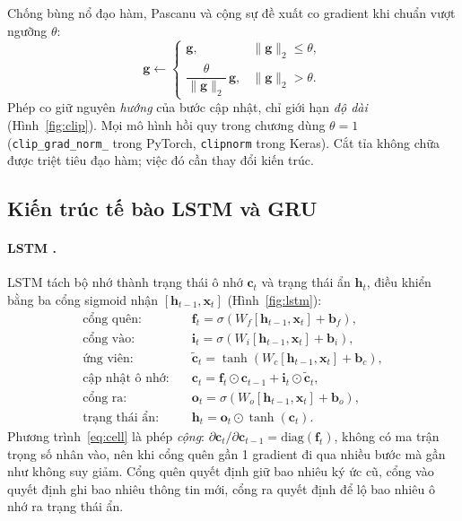 Chống bùng nổ đạo hàm, Pascanu và cộng sự \cite{pascanu2013} đề xuất co gradient khi chuẩn vượt ngưỡng $\theta$:
\begin{equation}
  \mathbf{g} \leftarrow \begin{cases} \mathbf{g}, & \lVert\mathbf{g}\rVert_2 \le \theta,\\[2pt]
    \dfrac{\theta}{\lVert\mathbf{g}\rVert_2}\,\mathbf{g}, & \lVert\mathbf{g}\rVert_2 > \theta. \end{cases}
\end{equation}
Phép co giữ nguyên \emph{hướng} của bước cập nhật, chỉ giới hạn \emph{độ dài} (Hình~\ref{fig:clip}). Mọi mô hình hồi quy
trong chương dùng $\theta = 1$ (\texttt{clip\_grad\_norm\_} trong PyTorch, \texttt{clipnorm} trong Keras). Cắt tỉa không
chữa được triệt tiêu đạo hàm; việc đó cần thay đổi kiến trúc.


\subsection{Kiến trúc tế bào LSTM và GRU}

\paragraph{LSTM \cite{hochreiter1997}.} LSTM tách bộ nhớ thành trạng thái ô nhớ $\mathbf{c}_t$ và trạng thái ẩn $\mathbf{h}_t$,
điều khiển bằng ba cổng sigmoid nhận $[\mathbf{h}_{t-1}, \mathbf{x}_t]$ (Hình~\ref{fig:lstm}):
\begin{align}
  \text{cổng quên:}\quad & \mathbf{f}_t = \sigma(W_f[\mathbf{h}_{t-1}, \mathbf{x}_t] + \mathbf{b}_f), \\
  \text{cổng vào:}\quad & \mathbf{i}_t = \sigma(W_i[\mathbf{h}_{t-1}, \mathbf{x}_t] + \mathbf{b}_i), \\
  \text{ứng viên:}\quad & \tilde{\mathbf{c}}_t = \tanh(W_c[\mathbf{h}_{t-1}, \mathbf{x}_t] + \mathbf{b}_c), \\
  \text{cập nhật ô nhớ:}\quad & \mathbf{c}_t = \mathbf{f}_t \odot \mathbf{c}_{t-1} + \mathbf{i}_t \odot \tilde{\mathbf{c}}_t, \label{eq:cell}\\
  \text{cổng ra:}\quad & \mathbf{o}_t = \sigma(W_o[\mathbf{h}_{t-1}, \mathbf{x}_t] + \mathbf{b}_o), \\
  \text{trạng thái ẩn:}\quad & \mathbf{h}_t = \mathbf{o}_t \odot \tanh(\mathbf{c}_t).
\end{align}
Phương trình~\eqref{eq:cell} là phép \emph{cộng}: $\partial\mathbf{c}_t/\partial\mathbf{c}_{t-1} = \mathrm{diag}(\mathbf{f}_t)$,
không có ma trận trọng số nhân vào, nên khi cổng quên gần 1 gradient đi qua nhiều bước mà gần như không suy giảm. Cổng quên
quyết định giữ bao nhiêu ký ức cũ, cổng vào quyết định ghi bao nhiêu thông tin mới, cổng ra quyết định để lộ bao nhiêu ô nhớ
ra trạng thái ẩn.

